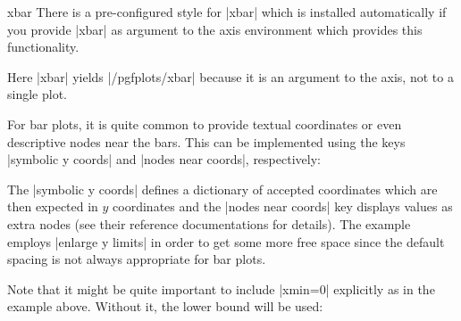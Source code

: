 {\begin{plottype}{xbar}
    There is a pre-configured style for |xbar| which is installed automatically
    if you provide |xbar| as argument to the axis environment which provides
    this functionality.
\begin{codeexample}[]
\end{codeexample}
    Here |xbar| yields |/pgfplots/xbar| because it is an argument to the axis,
    not to a single plot.

    For bar plots, it is quite common to provide textual coordinates or even
    descriptive nodes near the bars. This can be implemented using the keys
    |symbolic y coords| and |nodes near coords|, respectively:
\begin{codeexample}[]
\end{codeexample}
    The |symbolic y coords| defines a dictionary of accepted coordinates which
    are then expected in $y$ coordinates and the |nodes near coords| key
    displays values as extra nodes (see their reference documentations for
    details). The example employs |enlarge y limits| in order to get some more
    free space since the default spacing is not always appropriate for bar
    plots.

    Note that it might be quite important to include |xmin=0| explicitly as in
    the example above. Without it, the lower bound will be used:
\begin{codeexample}[]
\end{codeexample}


\end{plottype}}
